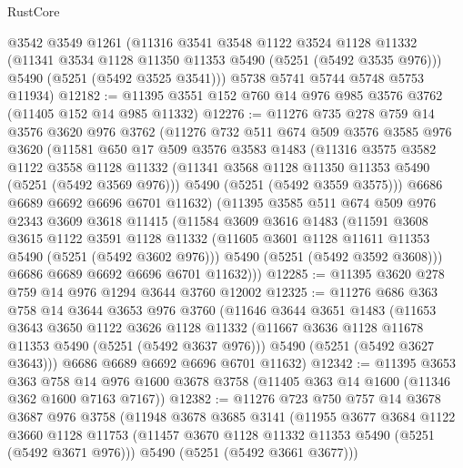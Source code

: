 \begin{lexlean}{RustCore}
\begin{coremodule}
      @3542
      @3549
      @1261
      (@11316
        @3541
        @3548
        @1122
        @3524
        @1128
        @11332
        (@11341 @3534 @1128 @11350 @11353 @5490 (@5251 (@5492 @3535 @976)))
        @5490
        (@5251 (@5492 @3525 @3541)))
      @5738
      @5741
      @5744
      @5748
      @5753
      @11934)
@12182 := @11395 @3551 @152 @760 @14 @976 @985 @3576 @3762 (@11405 @152 @14 @985 @11332)
@12276 := @11276
    @735
    @278
    @759
    @14
    @3576
    @3620
    @976
    @3762
    (@11276
      @732
      @511
      @674
      @509
      @3576
      @3585
      @976
      @3620
      (@11581
        @650
        @17
        @509
        @3576
        @3583
        @1483
        (@11316
          @3575
          @3582
          @1122
          @3558
          @1128
          @11332
          (@11341 @3568 @1128 @11350 @11353 @5490 (@5251 (@5492 @3569 @976)))
          @5490
          (@5251 (@5492 @3559 @3575)))
        @6686
        @6689
        @6692
        @6696
        @6701
        @11632)
      (@11395
        @3585
        @511
        @674
        @509
        @976
        @2343
        @3609
        @3618
        @11415
        (@11584
          @3609
          @3616
          @1483
          (@11591
            @3608
            @3615
            @1122
            @3591
            @1128
            @11332
            (@11605 @3601 @1128 @11611 @11353 @5490 (@5251 (@5492 @3602 @976)))
            @5490
            (@5251 (@5492 @3592 @3608)))
          @6686
          @6689
          @6692
          @6696
          @6701
          @11632)))
@12285 := @11395 @3620 @278 @759 @14 @976 @1294 @3644 @3760 @12002
@12325 := @11276
    @686
    @363
    @758
    @14
    @3644
    @3653
    @976
    @3760
    (@11646
      @3644
      @3651
      @1483
      (@11653
        @3643
        @3650
        @1122
        @3626
        @1128
        @11332
        (@11667 @3636 @1128 @11678 @11353 @5490 (@5251 (@5492 @3637 @976)))
        @5490
        (@5251 (@5492 @3627 @3643)))
      @6686
      @6689
      @6692
      @6696
      @6701
      @11632)
@12342 := @11395
    @3653
    @363
    @758
    @14
    @976
    @1600
    @3678
    @3758
    (@11405 @363 @14 @1600 (@11346 @362 @1600 @7163 @7167))
@12382 := @11276
    @723
    @750
    @757
    @14
    @3678
    @3687
    @976
    @3758
    (@11948
      @3678
      @3685
      @3141
      (@11955
        @3677
        @3684
        @1122
        @3660
        @1128
        @11753
        (@11457 @3670 @1128 @11332 @11353 @5490 (@5251 (@5492 @3671 @976)))
        @5490
        (@5251 (@5492 @3661 @3677)))

\end{coremodule}
\end{lexlean}
